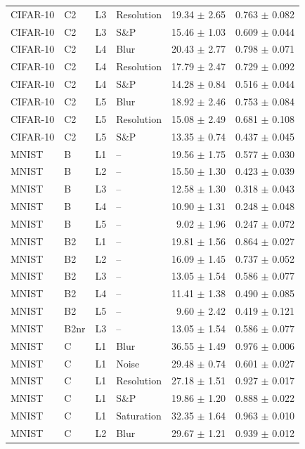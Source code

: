 \begin{table}[htbp]
\begin{tabular}{llllrr}
CIFAR-10 & C2 & L3 & Resolution & 19.34 $\pm$ 2.65 & 0.763 $\pm$ 0.082 \\
CIFAR-10 & C2 & L3 & S\&P & 15.46 $\pm$ 1.03 & 0.609 $\pm$ 0.044 \\
CIFAR-10 & C2 & L4 & Blur & 20.43 $\pm$ 2.77 & 0.798 $\pm$ 0.071 \\
CIFAR-10 & C2 & L4 & Resolution & 17.79 $\pm$ 2.47 & 0.729 $\pm$ 0.092 \\
CIFAR-10 & C2 & L4 & S\&P & 14.28 $\pm$ 0.84 & 0.516 $\pm$ 0.044 \\
CIFAR-10 & C2 & L5 & Blur & 18.92 $\pm$ 2.46 & 0.753 $\pm$ 0.084 \\
CIFAR-10 & C2 & L5 & Resolution & 15.08 $\pm$ 2.49 & 0.681 $\pm$ 0.108 \\
CIFAR-10 & C2 & L5 & S\&P & 13.35 $\pm$ 0.74 & 0.437 $\pm$ 0.045 \\
MNIST & B & L1 & -- & 19.56 $\pm$ 1.75 & 0.577 $\pm$ 0.030 \\
MNIST & B & L2 & -- & 15.50 $\pm$ 1.30 & 0.423 $\pm$ 0.039 \\
MNIST & B & L3 & -- & 12.58 $\pm$ 1.30 & 0.318 $\pm$ 0.043 \\
MNIST & B & L4 & -- & 10.90 $\pm$ 1.31 & 0.248 $\pm$ 0.048 \\
MNIST & B & L5 & -- & 9.02 $\pm$ 1.96 & 0.247 $\pm$ 0.072 \\
MNIST & B2 & L1 & -- & 19.81 $\pm$ 1.56 & 0.864 $\pm$ 0.027 \\
MNIST & B2 & L2 & -- & 16.09 $\pm$ 1.45 & 0.737 $\pm$ 0.052 \\
MNIST & B2 & L3 & -- & 13.05 $\pm$ 1.54 & 0.586 $\pm$ 0.077 \\
MNIST & B2 & L4 & -- & 11.41 $\pm$ 1.38 & 0.490 $\pm$ 0.085 \\
MNIST & B2 & L5 & -- & 9.60 $\pm$ 2.42 & 0.419 $\pm$ 0.121 \\
MNIST & B2nr & L3 & -- & 13.05 $\pm$ 1.54 & 0.586 $\pm$ 0.077 \\
MNIST & C & L1 & Blur & 36.55 $\pm$ 1.49 & 0.976 $\pm$ 0.006 \\
MNIST & C & L1 & Noise & 29.48 $\pm$ 0.74 & 0.601 $\pm$ 0.027 \\
MNIST & C & L1 & Resolution & 27.18 $\pm$ 1.51 & 0.927 $\pm$ 0.017 \\
MNIST & C & L1 & S\&P & 19.86 $\pm$ 1.20 & 0.888 $\pm$ 0.022 \\
MNIST & C & L1 & Saturation & 32.35 $\pm$ 1.64 & 0.963 $\pm$ 0.010 \\
MNIST & C & L2 & Blur & 29.67 $\pm$ 1.21 & 0.939 $\pm$ 0.012 \\

\end{tabular}
\end{table}
